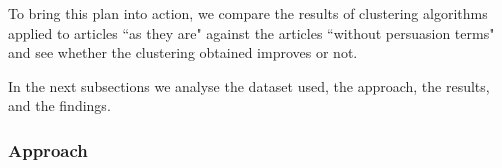 




To bring this plan into action, we compare the results of  clustering algorithms applied to articles ``as they are" against the articles ``without persuasion terms" and see whether the clustering obtained improves or not.

In the next subsections we analyse the dataset used, the approach, the results, and the findings.






\subsubsection{Approach}

